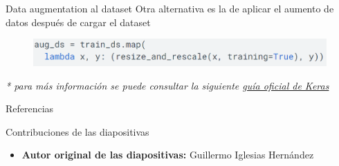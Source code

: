 \begin{frame}{Data augmentation al dataset}
Otra alternativa es la de aplicar el aumento de datos \alert{después de cargar el dataset}

\begin{figure}
    \centering
    \includegraphics[width=\textwidth]{Slides/figures/Tema 3/DAKeras_2.png}
\end{figure}

\textit{* para más información se puede consultar la siguiente \textcolor{blue}{\href{https://www.tensorflow.org/tutorials/images/data_augmentation}{guía oficial de Keras}}}
\end{frame}


\begin{frame}[allowframebreaks]{Referencias}
    
    
\end{frame}

\begin{frame}{Contribuciones de las diapositivas}
\begin{itemize}
    \item \textbf{Autor original de las diapositivas:} Guillermo Iglesias Hernández
\end{itemize}
\end{frame}

